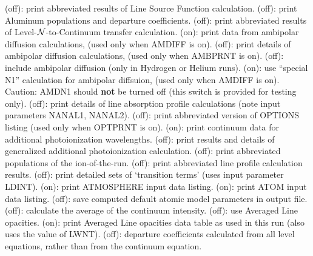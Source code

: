 \space \vbox { (off): \bang
print abbreviated results of Line Source Function calculation.}
\space \vbox { (off): \bang 
print Aluminum populations and departure coefficients.}
\space \vbox { (off): \bang
print abbreviated results of Level-${\cal N}$-to-Continuum transfer
calculation.}
\space \vbox { (on): \bang
print data from ambipolar diffusion calculations, (used only
when AMDIFF is on).}
\space \vbox { (off): \bang
print details of ambipolar diffusion calculations, (used only when
AMBPRNT is on).}
\space \vbox { (off): \bang
include ambipolar diffusion (only in Hydrogen or Helium runs).}
\space \vbox { (on): \bang
use ``special N1'' calculation for ambipolar diffsuion, (used only
when AMDIFF is on). Caution: AMDN1 should {\bf not} be turned off
(this switch is provided for testing only).}
\space \vbox { (off): \bang 
print details of line absorption profile calculations (note input parameters
\break NANAL1, NANAL2).}
\space \vbox { (off): \bang
print abbreviated version of OPTIONS listing (used only when OPTPRNT is on).}
\space \vbox { (on): \bang
print continuum data for additional photoionization wavelengths.}
\space \vbox { (off): \bang
print results and details of generalized additional photoionization
calculation.}
\space \vbox { (off): \bang
print abbreviated populations of the ion-of-the-run.}
\space \vbox { (off): \bang
print abbreviated line profile calculation results.}
\space \vbox { (off): \bang
print detailed sets of `transition terms' (uses input parameter LDINT).}
\space \vbox { (on): \bang
print ATMOSPHERE input data listing.}
\space \vbox { (on): \bang
print ATOM input data listing.}
\space \vbox { (off): \bang
save computed default atomic model parameters in output file.}
\space \vbox { (off): \bang
calculate the average of the continuum intensity.}
\space \vbox { (off): \bang
use Averaged Line opacities.}
\space \vbox { (on): \bang
print Averaged Line opacities data table as used in this run (also uses
the value of LWNT).}
\space \vbox { (off): \bang
departure coefficients calculated from all level equations, rather than
from the continuum equation.}
